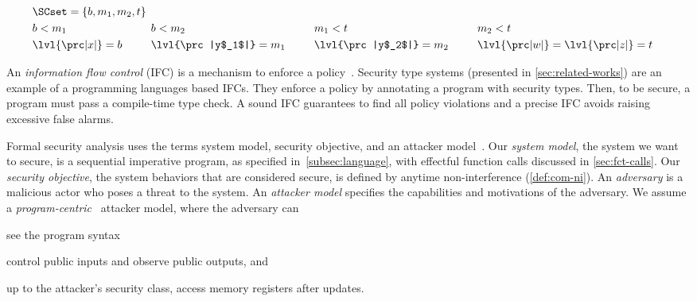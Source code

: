 \noindent
\begin{minipage}{.68\textwidth}
\noindent
\begin{alignat*}{7}
& \SCset = \{b, m_1, m_2, t\} \span \span \\ %
& b < m_1 & \hspace{1.6em} & b < m_2 & \hspace{1.6em} & m_1 < t &\hspace{1.6em} & m_2 < t\\
& \lvl{\prc|x|} = b && \lvl{\prc|y$_1$|} = m_1 && \lvl{\prc|y$_2$|}= m_2 && \lvl{\prc|w|} =  \lvl{\prc|z|}  = t
\end{alignat*}
\end{minipage}\hfill%
\begin{minipage}{.3\textwidth}\hfill%
\end{minipage}

An \emph{information flow control} (IFC) is a mechanism to enforce a policy~\cite{bishop2003}.
Security type systems (presented in \autoref{sec:related-works}) are an example of a programming languages based IFCs.
They enforce a policy by annotating a program with security types.
Then, to be secure, a program must pass a compile-time type check.
A sound IFC guarantees to find all policy violations and a precise IFC avoids raising excessive false alarms.

Formal security analysis uses the terms system model, security objective, and an attacker model~\cite{bau2011,bognar2022}.
Our \emph{system model}, \ie the system we want to secure, is a sequential imperative program, as specified in~\autoref{subsec:language}, with effectful function calls discussed in \autoref{sec:fct-calls}.
Our \emph{security objective}, \ie the system behaviors that are considered secure, is defined by anytime non-interference (\autoref{def:com-ni}).
An \emph{adversary} is a malicious actor who poses a threat to the system.
An \emph{attacker model} specifies the capabilities and motivations of the adversary.
We assume a \emph{program-centric}~\cite{hedin2012} attacker model, where the adversary can
\begin{enumerate*}[label=(\roman*)]
\item see the program syntax
\item control public inputs and observe public outputs, and
\item up to the attacker's security class, access memory registers after updates.
\end{enumerate*}

